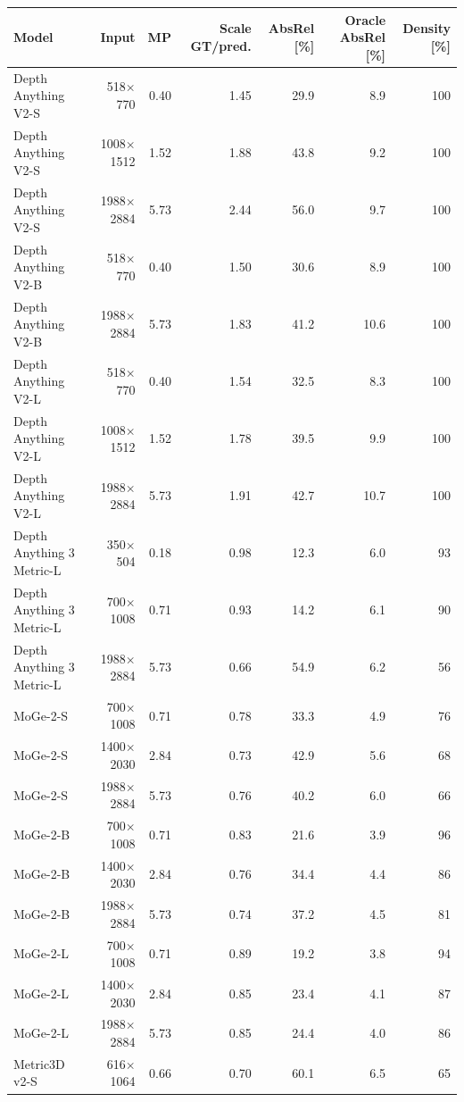 \begin{tabular}{@{}lrrrrrr@{}}
\toprule
Model & Input & MP & Scale GT/pred. & AbsRel [\%] & Oracle AbsRel [\%] & Density [\%] \\
\midrule
Depth Anything V2-S & 518$\times$770 & 0.40 & 1.45 & 29.9 & 8.9 & 100 \\
Depth Anything V2-S & 1008$\times$1512 & 1.52 & 1.88 & 43.8 & 9.2 & 100 \\
Depth Anything V2-S & 1988$\times$2884 & 5.73 & 2.44 & 56.0 & 9.7 & 100 \\
\addlinespace
Depth Anything V2-B & 518$\times$770 & 0.40 & 1.50 & 30.6 & 8.9 & 100 \\
Depth Anything V2-B & 1988$\times$2884 & 5.73 & 1.83 & 41.2 & 10.6 & 100 \\
\addlinespace
Depth Anything V2-L & 518$\times$770 & 0.40 & 1.54 & 32.5 & 8.3 & 100 \\
Depth Anything V2-L & 1008$\times$1512 & 1.52 & 1.78 & 39.5 & 9.9 & 100 \\
Depth Anything V2-L & 1988$\times$2884 & 5.73 & 1.91 & 42.7 & 10.7 & 100 \\
\addlinespace
Depth Anything 3 Metric-L & 350$\times$504 & 0.18 & 0.98 & 12.3 & 6.0 & 93 \\
Depth Anything 3 Metric-L & 700$\times$1008 & 0.71 & 0.93 & 14.2 & 6.1 & 90 \\
Depth Anything 3 Metric-L & 1988$\times$2884 & 5.73 & 0.66 & 54.9 & 6.2 & 56 \\
\addlinespace
MoGe-2-S & 700$\times$1008 & 0.71 & 0.78 & 33.3 & 4.9 & 76 \\
MoGe-2-S & 1400$\times$2030 & 2.84 & 0.73 & 42.9 & 5.6 & 68 \\
MoGe-2-S & 1988$\times$2884 & 5.73 & 0.76 & 40.2 & 6.0 & 66 \\
\addlinespace
MoGe-2-B & 700$\times$1008 & 0.71 & 0.83 & 21.6 & 3.9 & 96 \\
MoGe-2-B & 1400$\times$2030 & 2.84 & 0.76 & 34.4 & 4.4 & 86 \\
MoGe-2-B & 1988$\times$2884 & 5.73 & 0.74 & 37.2 & 4.5 & 81 \\
\addlinespace
MoGe-2-L & 700$\times$1008 & 0.71 & 0.89 & 19.2 & 3.8 & 94 \\
MoGe-2-L & 1400$\times$2030 & 2.84 & 0.85 & 23.4 & 4.1 & 87 \\
MoGe-2-L & 1988$\times$2884 & 5.73 & 0.85 & 24.4 & 4.0 & 86 \\
\addlinespace
Metric3D v2-S & 616$\times$1064 & 0.66 & 0.70 & 60.1 & 6.5 & 65 \\

\end{tabular}
